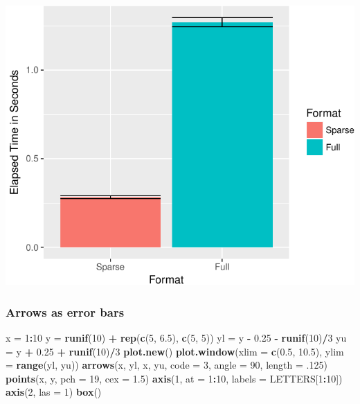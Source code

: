 \documentclass[]{book}
\newenvironment{Shaded}{\begin{snugshade}}{\end{snugshade}}
\newcommand{\DataTypeTok}[1]{\textcolor[rgb]{0.13,0.29,0.53}{#1}}
\newcommand{\DecValTok}[1]{\textcolor[rgb]{0.00,0.00,0.81}{#1}}
\newcommand{\FloatTok}[1]{\textcolor[rgb]{0.00,0.00,0.81}{#1}}
\newcommand{\KeywordTok}[1]{\textcolor[rgb]{0.13,0.29,0.53}{\textbf{#1}}}
\newcommand{\NormalTok}[1]{#1}
\newcommand{\OperatorTok}[1]{\textcolor[rgb]{0.81,0.36,0.00}{\textbf{#1}}}
\newcommand{\StringTok}[1]{\textcolor[rgb]{0.31,0.60,0.02}{#1}}
\theoremstyle{definition}
\theoremstyle{definition}
\theoremstyle{definition}
\theoremstyle{remark}
\begin{document}
\includegraphics[width=0.5\linewidth]{Rcourse_files/figure-latex/unnamed-chunk-262-1}

\hypertarget{arrows-as-error-bars}{%
\subsubsection{Arrows as error bars}\label{arrows-as-error-bars}}

\begin{Shaded}
\begin{Highlighting}[]
\NormalTok{x =}\StringTok{ }\DecValTok{1}\OperatorTok{:}\DecValTok{10}
\NormalTok{y =}\StringTok{ }\KeywordTok{runif}\NormalTok{(}\DecValTok{10}\NormalTok{) }\OperatorTok{+}\StringTok{ }\KeywordTok{rep}\NormalTok{(}\KeywordTok{c}\NormalTok{(}\DecValTok{5}\NormalTok{, }\FloatTok{6.5}\NormalTok{), }\KeywordTok{c}\NormalTok{(}\DecValTok{5}\NormalTok{, }\DecValTok{5}\NormalTok{))}
\NormalTok{yl =}\StringTok{ }\NormalTok{y }\OperatorTok{-}\StringTok{ }\FloatTok{0.25} \OperatorTok{-}\StringTok{ }\KeywordTok{runif}\NormalTok{(}\DecValTok{10}\NormalTok{)}\OperatorTok{/}\DecValTok{3}
\NormalTok{yu =}\StringTok{ }\NormalTok{y }\OperatorTok{+}\StringTok{ }\FloatTok{0.25} \OperatorTok{+}\StringTok{ }\KeywordTok{runif}\NormalTok{(}\DecValTok{10}\NormalTok{)}\OperatorTok{/}\DecValTok{3}
\KeywordTok{plot.new}\NormalTok{()}
\KeywordTok{plot.window}\NormalTok{(}\DataTypeTok{xlim =} \KeywordTok{c}\NormalTok{(}\FloatTok{0.5}\NormalTok{, }\FloatTok{10.5}\NormalTok{), }\DataTypeTok{ylim =} \KeywordTok{range}\NormalTok{(yl, yu))}
\KeywordTok{arrows}\NormalTok{(x, yl, x, yu, }\DataTypeTok{code =} \DecValTok{3}\NormalTok{, }\DataTypeTok{angle =} \DecValTok{90}\NormalTok{, }\DataTypeTok{length =} \FloatTok{.125}\NormalTok{)}
\KeywordTok{points}\NormalTok{(x, y, }\DataTypeTok{pch =} \DecValTok{19}\NormalTok{, }\DataTypeTok{cex =} \FloatTok{1.5}\NormalTok{)}
\KeywordTok{axis}\NormalTok{(}\DecValTok{1}\NormalTok{, }\DataTypeTok{at =} \DecValTok{1}\OperatorTok{:}\DecValTok{10}\NormalTok{, }\DataTypeTok{labels =}\NormalTok{ LETTERS[}\DecValTok{1}\OperatorTok{:}\DecValTok{10}\NormalTok{])}
\KeywordTok{axis}\NormalTok{(}\DecValTok{2}\NormalTok{, }\DataTypeTok{las =} \DecValTok{1}\NormalTok{)}
\KeywordTok{box}\NormalTok{()}
\end{Highlighting}
\end{Shaded}
\end{document}
